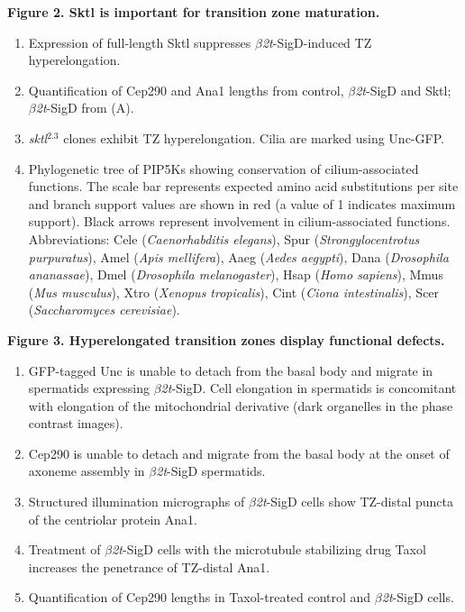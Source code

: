 \documentclass[12pt, twoside, letterpaper]{article}
\newcommand{\sigd}{$\beta$\textit{2t}-SigD}
\begin{document}
\begin{doublespacing}
\begin{linenumbers}
    \textbf{Figure 2. Sktl is important for transition zone maturation.}
    \begin{enumerate}[label={(\Alph*)}, nolistsep]
    \item Expression of full-length Sktl suppresses \sigd{}-induced TZ hyperelongation.
    \item Quantification of Cep290 and Ana1 lengths from control, \sigd{} and Sktl; \sigd{} from (A).
    \item \textit{sktl}$^{2.3}$ clones exhibit TZ hyperelongation. Cilia are marked using
      Unc-GFP.
    \item Phylogenetic tree of PIP5Ks showing conservation of cilium-associated functions.
      The scale bar represents expected amino acid substitutions per site and branch support values are shown in red (a value of 1 indicates maximum support).
      Black arrows represent involvement in cilium-associated functions.
      Abbreviations: Cele (\textit{Caenorhabditis elegans}), Spur (\textit{Strongylocentrotus purpuratus}), Amel (\textit{Apis mellifera}), Aaeg (\textit{Aedes aegypti}), Dana (\textit{Drosophila ananassae}), Dmel (\textit{Drosophila melanogaster}), Hsap (\textit{Homo sapiens}), Mmus (\textit{Mus musculus}), Xtro (\textit{Xenopus tropicalis}), Cint (\textit{Ciona intestinalis}), Scer (\textit{Saccharomyces cerevisiae}).
    \end{enumerate}
    
    
    \textbf{Figure 3. Hyperelongated transition zones display functional defects.}
    \begin{enumerate}[label={(\Alph*)}, nolistsep]
    \item GFP-tagged Unc is unable to detach from the basal body and migrate in spermatids expressing \sigd{}.
      Cell elongation in spermatids is concomitant with elongation of the mitochondrial derivative (dark organelles in the phase contrast images).
    \item Cep290 is unable to detach and migrate from the basal body at the onset of axoneme assembly in \sigd{} spermatids.
    \item Structured illumination micrographs of \sigd{} cells show TZ-distal puncta of the centriolar protein Ana1.
    \item Treatment of \sigd{} cells with the microtubule stabilizing drug Taxol increases the penetrance of TZ-distal Ana1.
    \item Quantification of Cep290 lengths in Taxol-treated control and \sigd{} cells.
    \end{enumerate}



\end{linenumbers}
\end{doublespacing}
\end{document}

